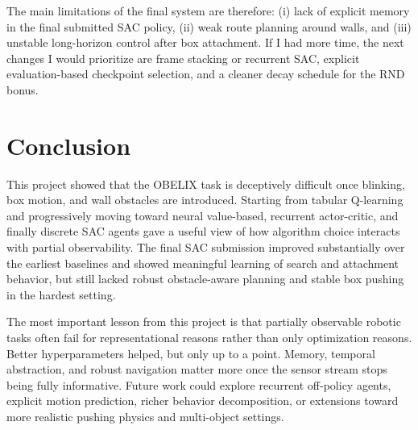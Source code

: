 \documentclass[11pt,oneside]{article}
\begin{document}
The main limitations of the final system are therefore: (i) lack of explicit memory in the final submitted SAC policy, (ii) weak route planning around walls, and (iii) unstable long-horizon control after box attachment. If I had more time, the next changes I would prioritize are frame stacking or recurrent SAC, explicit evaluation-based checkpoint selection, and a cleaner decay schedule for the RND bonus.

\section{Conclusion}
This project showed that the OBELIX task is deceptively difficult once blinking, box motion, and wall obstacles are introduced. Starting from tabular Q-learning and progressively moving toward neural value-based, recurrent actor-critic, and finally discrete SAC agents gave a useful view of how algorithm choice interacts with partial observability. The final SAC submission improved substantially over the earliest baselines and showed meaningful learning of search and attachment behavior, but still lacked robust obstacle-aware planning and stable box pushing in the hardest setting.

The most important lesson from this project is that partially observable robotic tasks often fail for representational reasons rather than only optimization reasons. Better hyperparameters helped, but only up to a point. Memory, temporal abstraction, and robust navigation matter more once the sensor stream stops being fully informative. Future work could explore recurrent off-policy agents, explicit motion prediction, richer behavior decomposition, or extensions toward more realistic pushing physics and multi-object settings.
\end{document}
